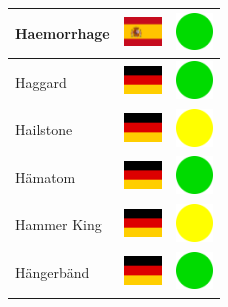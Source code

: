 \documentclass[12pt, a4paper, twoside]{report}
\begin{document}
\begin{center}
\begin{longtable}{|p{5cm}|p{2cm}|p{2cm}|}
 Haemorrhage                                                & \includegraphics[width=1cm]{../img/flags/es} &   \includegraphics[width=1cm]{../likes/y} \\ \hline
 Haggard                                                    & \includegraphics[width=1cm]{../img/flags/de} &   \includegraphics[width=1cm]{../likes/y} \\ \hline
 Hailstone                                                  & \includegraphics[width=1cm]{../img/flags/de} &   \includegraphics[width=1cm]{../likes/m} \\ \hline
 Hämatom                                                    & \includegraphics[width=1cm]{../img/flags/de} &   \includegraphics[width=1cm]{../likes/y} \\ \hline
 Hammer King                                                & \includegraphics[width=1cm]{../img/flags/de} &   \includegraphics[width=1cm]{../likes/m} \\ \hline
 Hängerbänd                                                 & \includegraphics[width=1cm]{../img/flags/de} &   \includegraphics[width=1cm]{../likes/y} \\ \hline

\end{longtable}
\end{center}
\end{document}
